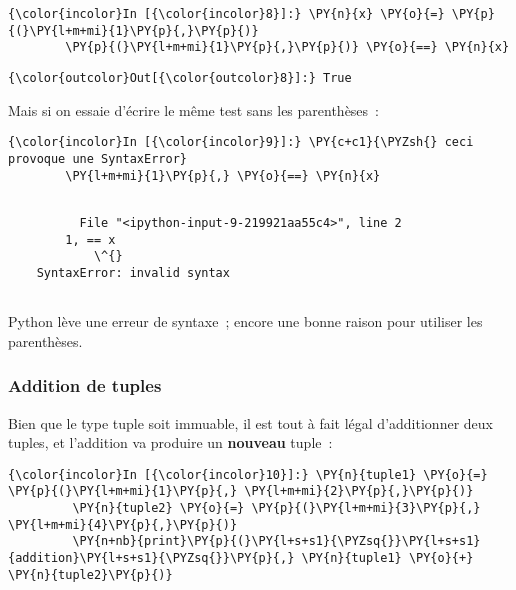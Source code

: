     \begin{Verbatim}[commandchars=\\\{\}]
{\color{incolor}In [{\color{incolor}8}]:} \PY{n}{x} \PY{o}{=} \PY{p}{(}\PY{l+m+mi}{1}\PY{p}{,}\PY{p}{)}
        \PY{p}{(}\PY{l+m+mi}{1}\PY{p}{,}\PY{p}{)} \PY{o}{==} \PY{n}{x}
\end{Verbatim}


\begin{Verbatim}[commandchars=\\\{\}]
{\color{outcolor}Out[{\color{outcolor}8}]:} True
\end{Verbatim}
            
    Mais si on essaie d'écrire le même test sans les parenthèses~:

    \begin{Verbatim}[commandchars=\\\{\}]
{\color{incolor}In [{\color{incolor}9}]:} \PY{c+c1}{\PYZsh{} ceci provoque une SyntaxError}
        \PY{l+m+mi}{1}\PY{p}{,} \PY{o}{==} \PY{n}{x}
\end{Verbatim}


    \begin{Verbatim}[commandchars=\\\{\}]

          File "<ipython-input-9-219921aa55c4>", line 2
        1, == x
            \^{}
    SyntaxError: invalid syntax
    

    \end{Verbatim}

    Python lève une erreur de syntaxe~; encore une bonne raison pour
utiliser les parenthèses.

    \hypertarget{addition-de-tuples}{%
\subsubsection{Addition de tuples}\label{addition-de-tuples}}

    Bien que le type tuple soit immuable, il est tout à fait légal
d'additionner deux tuples, et l'addition va produire un \textbf{nouveau}
tuple~:

    \begin{Verbatim}[commandchars=\\\{\}]
{\color{incolor}In [{\color{incolor}10}]:} \PY{n}{tuple1} \PY{o}{=} \PY{p}{(}\PY{l+m+mi}{1}\PY{p}{,} \PY{l+m+mi}{2}\PY{p}{,}\PY{p}{)}
         \PY{n}{tuple2} \PY{o}{=} \PY{p}{(}\PY{l+m+mi}{3}\PY{p}{,} \PY{l+m+mi}{4}\PY{p}{,}\PY{p}{)}
         \PY{n+nb}{print}\PY{p}{(}\PY{l+s+s1}{\PYZsq{}}\PY{l+s+s1}{addition}\PY{l+s+s1}{\PYZsq{}}\PY{p}{,} \PY{n}{tuple1} \PY{o}{+} \PY{n}{tuple2}\PY{p}{)}
\end{Verbatim}


